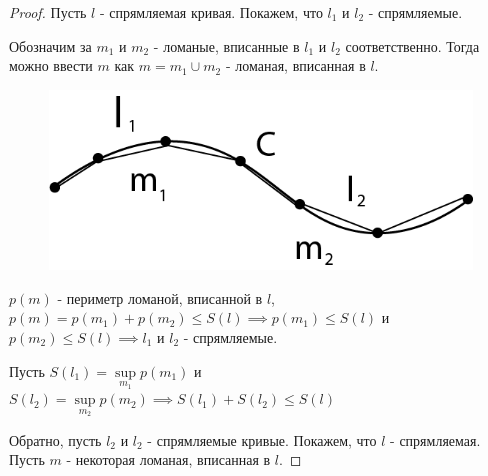 \documentclass{report}
\theoremstyle{definition}
\begin{document}
\begin{proof}
  Пусть $l$ - спрямляемая кривая. Покажем, что $l_1$ и $l_2$ - спрямляемые.

  Обозначим за $m_1$ и $m_2$ - ломаные, вписанные в $l_1$ и $l_2$ соответственно. Тогда можно ввести
  $m$ как $m = m_1 \cup m_2$ - ломаная, вписанная в $l$.
  \begin{figure}[H]
    \begin{center}
      \includegraphics[scale=0.2]{graph13.png}\label{figure13}
    \end{center}
  \end{figure}

  $p(m)$ - периметр ломаной, вписанной в $l$, $p(m) = p(m_1) + p(m_2) \leqslant S(l) \implies
    p(m_1)\leqslant S(l)$ и $p(m_2) \leqslant S(l) \implies l_1$ и $l_2$ - спрямляемые.

  Пусть $S(l_1) = \underset{m_1}{\sup} p(m_1)$ и $S(l_2) = \underset{m_2}{\sup} p(m_2) \implies
    S(l_1) + S(l_2) \leqslant S(l)$

  Обратно, пусть $l_2$ и $l_2$ - спрямляемые кривые. Покажем, что $l$ - спрямляемая. Пусть $m$
  - некоторая ломаная, вписанная в $l$.


\end{proof}
\end{document}
